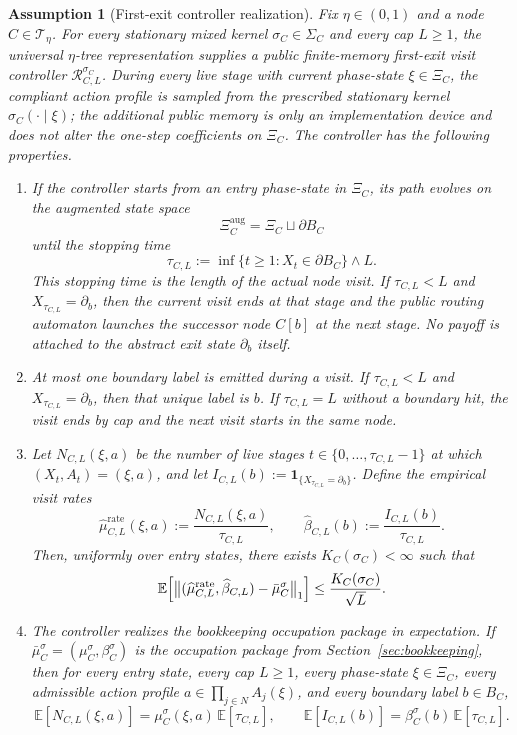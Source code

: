 \documentclass[12pt]{article}
\newtheorem{assumption}[theorem]{Assumption}
\theoremstyle{definition}
\newcommand{\E}{\mathbb{E}}
\newcommand{\1}{\mathbf{1}}
\newcommand{\cT}{\mathcal{T}}
\begin{document}
\begin{assumption}[First-exit controller realization]
\label{ass:controller-input}
Fix $\eta\in(0,1)$ and a node $C\in\cT_\eta$. For every stationary mixed kernel
$\sigma_C\in\Sigma_C$ and every cap $L\ge 1$, the universal
$\eta$-tree representation supplies a public finite-memory first-exit
\emph{visit controller} $\mathcal R_{C,L}^{\sigma_C}$. During every live stage
with current phase-state $\xi\in\Xi_C$, the compliant action profile is sampled
from the prescribed stationary kernel $\sigma_C(\cdot\mid\xi)$; the additional
public memory is only an implementation device and does not alter the one-step
coefficients on $\Xi_C$. The controller has the following properties.
\begin{enumerate}[label=\textnormal{(R\arabic*)},leftmargin=2.8em]
\item If the controller starts from an entry phase-state in $\Xi_C$, its path
evolves on the augmented state space
\[
\Xi_C^{\mathrm{aug}}=\Xi_C\sqcup\partial B_C
\]
until the stopping time
\[
\tau_{C,L}
:=
\inf\{t\ge 1:X_t\in\partial B_C\}\wedge L.
\]
This stopping time is the length of the actual node visit. If
$\tau_{C,L}<L$ and $X_{\tau_{C,L}}=\partial_b$, then the current visit ends at
that stage and the public routing automaton launches the successor node $C[b]$
at the next stage. No payoff is attached to the abstract exit state
$\partial_b$ itself.
\item At most one boundary label is emitted during a visit. If
$\tau_{C,L}<L$ and $X_{\tau_{C,L}}=\partial_b$, then that unique label is $b$.
If $\tau_{C,L}=L$ without a boundary hit, the visit ends by cap and the next
visit starts in the same node.
\item Let $N_{C,L}(\xi,a)$ be the number of live stages
$t\in\{0,\dots,\tau_{C,L}-1\}$ at which $(X_t,A_t)=(\xi,a)$, and let
$I_{C,L}(b):=\1_{\{X_{\tau_{C,L}}=\partial_b\}}$. Define the empirical visit
rates
\[
\widehat\mu_{C,L}^{\mathrm{rate}}(\xi,a):=\frac{N_{C,L}(\xi,a)}{\tau_{C,L}},
\qquad
\widehat\beta_{C,L}(b):=\frac{I_{C,L}(b)}{\tau_{C,L}}.
\]
Then, uniformly over entry states, there exists $K_C(\sigma_C)<\infty$ such that
\begin{equation}
\label{eq:controller-input-occ}
\E\Bigl[
\bigl\|(\widehat\mu_{C,L}^{\mathrm{rate}},\widehat\beta_{C,L})
-
\bar\mu_C^\sigma
\bigr\|_1
\Bigr]
\le \frac{K_C(\sigma_C)}{\sqrt L}.
\end{equation}
\item The controller realizes the bookkeeping occupation package in expectation.
If $\bar\mu_C^\sigma=(\mu_C^\sigma,\beta_C^\sigma)$ is the occupation package
from Section~\ref{sec:bookkeeping}, then for every entry state, every cap
$L\ge 1$, every phase-state $\xi\in\Xi_C$, every admissible action profile
$a\in \prod_{j\in N}A_j(\xi)$, and every boundary label $b\in B_C$,
\begin{equation}
\label{eq:controller-input-expected-counts}
\E[N_{C,L}(\xi,a)]
=
\mu_C^\sigma(\xi,a)\,\E[\tau_{C,L}],
\qquad
\E[I_{C,L}(b)]
=
\beta_C^\sigma(b)\,\E[\tau_{C,L}].
\end{equation}
\end{enumerate}
\end{assumption}
\end{document}

